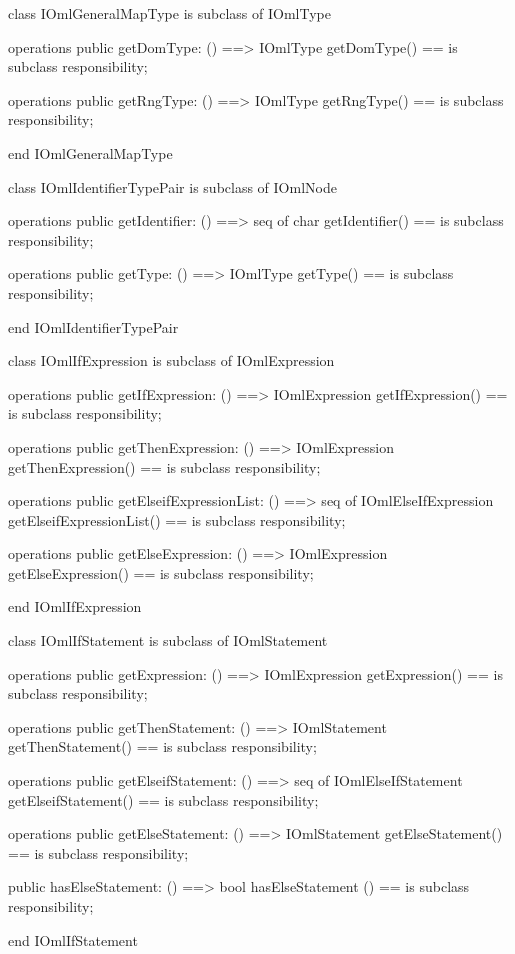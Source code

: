 \begin{vdm_al}
class IOmlGeneralMapType
 is subclass of IOmlType

operations
  public getDomType: () ==> IOmlType
  getDomType() == is subclass responsibility;

operations
  public getRngType: () ==> IOmlType
  getRngType() == is subclass responsibility;

end IOmlGeneralMapType
\end{vdm_al}

\begin{vdm_al}
class IOmlIdentifierTypePair
 is subclass of IOmlNode

operations
  public getIdentifier: () ==> seq of char
  getIdentifier() == is subclass responsibility;

operations
  public getType: () ==> IOmlType
  getType() == is subclass responsibility;

end IOmlIdentifierTypePair
\end{vdm_al}

\begin{vdm_al}
class IOmlIfExpression
 is subclass of IOmlExpression

operations
  public getIfExpression: () ==> IOmlExpression
  getIfExpression() == is subclass responsibility;

operations
  public getThenExpression: () ==> IOmlExpression
  getThenExpression() == is subclass responsibility;

operations
  public getElseifExpressionList: () ==> seq of IOmlElseIfExpression
  getElseifExpressionList() == is subclass responsibility;

operations
  public getElseExpression: () ==> IOmlExpression
  getElseExpression() == is subclass responsibility;

end IOmlIfExpression
\end{vdm_al}

\begin{vdm_al}
class IOmlIfStatement
 is subclass of IOmlStatement

operations
  public getExpression: () ==> IOmlExpression
  getExpression() == is subclass responsibility;

operations
  public getThenStatement: () ==> IOmlStatement
  getThenStatement() == is subclass responsibility;

operations
  public getElseifStatement: () ==> seq of IOmlElseIfStatement
  getElseifStatement() == is subclass responsibility;

operations
  public getElseStatement: () ==> IOmlStatement
  getElseStatement() == is subclass responsibility;

  public hasElseStatement: () ==> bool
  hasElseStatement () == is subclass responsibility;

end IOmlIfStatement
\end{vdm_al}

